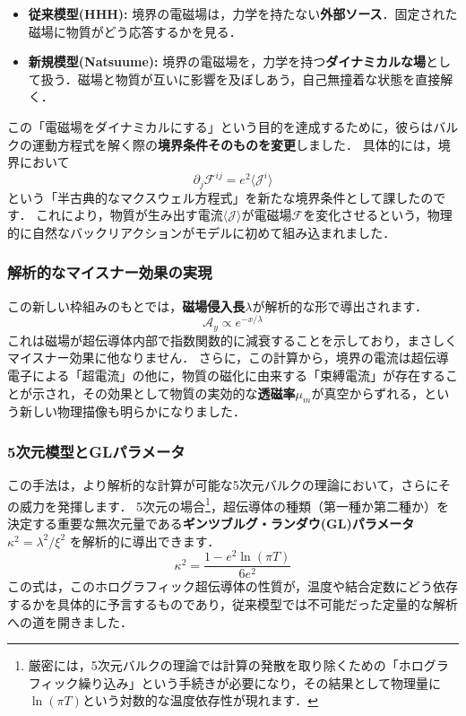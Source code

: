 \documentclass[b5paper,11pt,dvipdfmx]{jsarticle}
\numberwithin{equation}{section}
\theoremstyle{definition}
\begin{document}
\begin{itemize}
    \item \textbf{従来模型(HHH):} 境界の電磁場は，力学を持たない\textbf{外部ソース}．固定された磁場に物質がどう応答するかを見る．
    \item \textbf{新規模型(Natsuume):} 境界の電磁場を，力学を持つ\textbf{ダイナミカルな場}として扱う．磁場と物質が互いに影響を及ぼしあう，自己無撞着な状態を直接解く．
\end{itemize}

この「電磁場をダイナミカルにする」という目的を達成するために，彼らはバルクの運動方程式を解く際の\textbf{境界条件そのものを変更}しました．
具体的には，境界において
\begin{equation}
    \partial_{j} \mathcal{F}^{ij} = e^{2} \langle \mathcal{J}^{i} \rangle
\end{equation}
という「半古典的なマクスウェル方程式」を新たな境界条件として課したのです．
これにより，物質が生み出す電流$\langle \mathcal{J} \rangle$が電磁場$\mathcal{F}$を変化させるという，物理的に自然なバックリアクションがモデルに初めて組み込まれました．

\subsubsection*{解析的なマイスナー効果の実現}

この新しい枠組みのもとでは，\textbf{磁場侵入長$\lambda$}が解析的な形で導出されます．
\begin{equation}
    \mathcal{A}_{y} \propto e^{-x/\lambda}
\end{equation}
これは磁場が超伝導体内部で指数関数的に減衰することを示しており，まさしくマイスナー効果に他なりません．
さらに，この計算から，境界の電流は超伝導電子による「超電流」の他に，物質の磁化に由来する「束縛電流」が存在することが示され，その効果として物質の実効的な\textbf{透磁率$\mu_m$}が真空からずれる，という新しい物理描像も明らかになりました．

\subsubsection*{5次元模型とGLパラメータ}

この手法は，より解析的な計算が可能な5次元バルクの理論において，さらにその威力を発揮します．
5次元の場合\footnote{
厳密には，5次元バルクの理論では計算の発散を取り除くための「ホログラフィック繰り込み」という手続きが必要になり，その結果として物理量に$\ln(\pi T)$という対数的な温度依存性が現れます．
}，超伝導体の種類（第一種か第二種か）を決定する重要な無次元量である\textbf{ギンツブルグ・ランダウ(GL)パラメータ $\kappa^2 = \lambda^2 / \xi^2$} を解析的に導出できます．
\begin{equation}
     \kappa^2 = \frac{1-e^{2}\ln(\pi T)}{6e^{2}}
\end{equation}
この式は，このホログラフィック超伝導体の性質が，温度や結合定数にどう依存するかを具体的に予言するものであり，従来模型では不可能だった定量的な解析への道を開きました．






\end{document}
